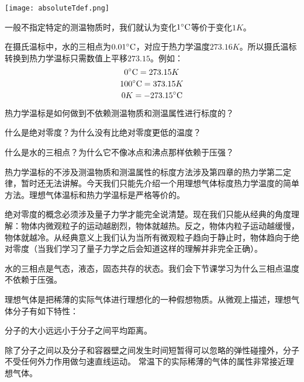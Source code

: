 \documentclass[CJK]{beamer}
\begin{document}
\begin{frame}
\bch
\texttt{[image: absoluteTdef.png]}

一般不指定特定的测温物质时，我们就认为变化$1^\circ \mathrm{C}$等价于变化$1K$。 

在摄氏温标中，水的三相点为$0.01^\circ \mathrm{C}$，对应于热力学温度$273.16K$。所以摄氏温标转换到热力学温标只需数值上平移$273.15$。例如： 
$$0^\circ \mathrm{C} = 273.15 K$$
$$100^\circ \mathrm{C} = 373.15K$$
$$0K = -273.15 ^\circ \mathrm{C}$$
\ech
\end{frame}

\begin{frame}
\bch
\bitem
\item{热力学温标是如何做到不依赖测温物质和测温属性进行标度的？}
\item{什么是绝对零度？为什么没有比绝对零度更低的温度？}
\item{什么是水的三相点？为什么它不像冰点和沸点那样依赖于压强？}
\eitem
\ech
\end{frame}

\begin{frame}
\bch
\bitem
\item{热力学温标的不涉及测温物质和测温属性的标度方法涉及第四章的热力学第二定律，暂时还无法讲解。今天我们只能先介绍一个用理想气体标度热力学温度的简单方法。理想气体温标和热力学温标是严格等价的。}
\item{绝对零度的概念必须涉及量子力学才能完全说清楚。现在我们只能从经典的角度理解：物体内微观粒子的运动越剧烈，物体就越热。反之，物体内粒子运动越缓慢，物体就越冷。从经典意义上我们认为当所有微观粒子趋向于静止时，物体趋向于绝对零度（当我们学习了量子力学之后会知道这样的理解并非完全正确）。}
\item{水的三相点是气态，液态，固态共存的状态。我们会下节课学习为什么三相点温度不依赖于压强。}
\eitem
\ech
\end{frame}


\begin{frame}
\bch
理想气体是把稀薄的实际气体进行理想化的一种假想物质。从微观上描述，理想气体分子有如下特性：
\bitem
\item{分子的大小远远小于分子之间平均距离。}
\item{除了分子之间以及分子和容器壁之间发生时间短暂得可以忽略的弹性碰撞外，分子不受任何外力作用做匀速直线运动。}
\eitem
常温下的实际稀薄的气体的属性非常接近理想气体。

\ech
\end{frame}
\end{document}
